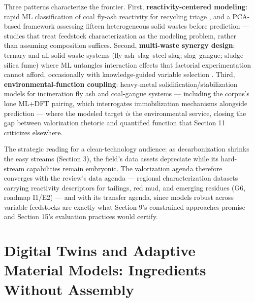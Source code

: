 \documentclass[pdflatex,sn-basic]{sn-jnl}
\begin{document}
Three patterns characterize the frontier. First, \textbf{reactivity-centered modeling}: rapid ML classification of coal fly-ash reactivity for recycling triage \citep{qi2022}, and a PCA-based framework assessing fifteen heterogeneous solid wastes before prediction \citep{song2025} --- studies that treat feedstock characterization as the modeling problem, rather than assuming composition suffices. Second, \textbf{multi-waste synergy design}: ternary and all-solid-waste systems (fly ash--slag--steel slag; slag--gangue; sludge--silica fume) where ML untangles interaction effects that factorial experimentation cannot afford, occasionally with knowledge-guided variable selection \citep{su2026}. Third, \textbf{environmental-function coupling}: heavy-metal solidification/stabilization models for incineration fly ash and coal-gangue systems --- including the corpus's lone ML+DFT pairing, which interrogates immobilization mechanisms alongside prediction --- where the modeled target \emph{is} the environmental service, closing the gap between valorization rhetoric and quantified function that Section 11 criticizes elsewhere.

The strategic reading for a clean-technology audience: as decarbonization shrinks the easy streams (Section 3), the field's data assets depreciate while its hard-stream capabilities remain embryonic. The valorization agenda therefore converges with the review's data agenda --- regional characterization datasets carrying reactivity descriptors for tailings, red mud, and emerging residues (G6, roadmap I1/E2) --- and with its transfer agenda, since models robust across variable feedstocks are exactly what Section 9's constrained approaches promise and Section 15's evaluation practices would certify.

\section{Digital Twins and Adaptive Material Models: Ingredients Without Assembly}
\end{document}
